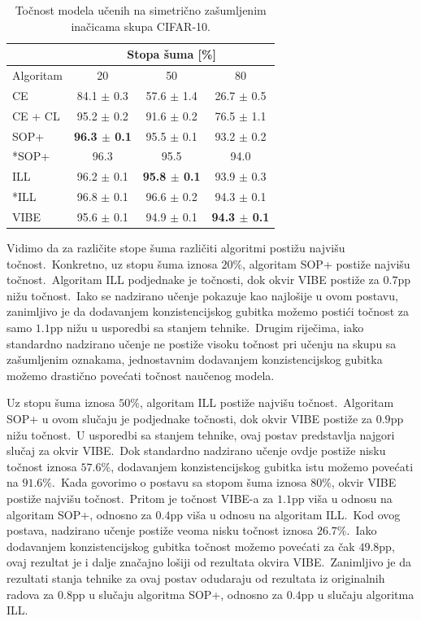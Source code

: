 \documentclass[diplomskirad]{fer}
\begin{document}
\begin{table}[htb]
  \caption{Točnost modela učenih na simetrično zašumljenim inačicama skupa CIFAR-10.}
  \label{tbl:usporedba_simetricne}
  \centering
  \begin{tabular}{l||ccc}
  & \multicolumn{3}{c}{Stopa šuma [\%]} \\ \hline
  Algoritam & 20 & 50 & 80 \\ \hline \hline
  CE & 84.1 $\pm$ 0.3 & 57.6 $\pm$ 1.4 & 26.7 $\pm$ 0.5\\
  CE + CL & 95.2 $\pm$ 0.2 & 91.6 $\pm$ 0.2 & 76.5 $\pm$ 1.1 \\ \hline
  SOP+ & \textbf{96.3 $\pm$ 0.1} & 95.5 $\pm$ 0.1 & 93.2 $\pm$ 0.2 \\
  *SOP+ & 96.3 & 95.5 & 94.0 \\
  ILL & 96.2 $\pm$ 0.1 & \textbf{95.8 $\pm$ 0.1} & 93.9 $\pm$ 0.3 \\
  *ILL & 96.8 $\pm$ 0.1 & 96.6 $\pm$ 0.2 & 94.3 $\pm$ 0.1 \\ \hline
  VIBE & 95.6 $\pm$ 0.1 & 94.9 $\pm$ 0.1 & \textbf{94.3 $\pm$ 0.1} \\
  \end{tabular}
\end{table}

\pagebreak

Vidimo da za različite stope šuma različiti algoritmi postižu najvišu točnost.\ 
Konkretno, uz stopu šuma iznosa $20\%$, algoritam SOP+ postiže najvišu točnost.\ Algoritam ILL podjednake je točnosti, dok okvir VIBE postiže za $0.7$pp nižu točnost.\ 
Iako se nadzirano učenje pokazuje kao najlošije u ovom postavu, zanimljivo je da dodavanjem konzistencijskog gubitka možemo postići točnost za samo $1.1$pp nižu u usporedbi sa stanjem tehnike.\ 
Drugim riječima, iako standardno nadzirano učenje ne postiže visoku točnost pri učenju na skupu sa zašumljenim oznakama, jednostavnim dodavanjem konzistencijskog gubitka možemo drastično povećati točnost naučenog modela.\ 

Uz stopu šuma iznosa $50\%$, algoritam ILL postiže najvišu točnost.\ Algoritam SOP+ u ovom slučaju je podjednake točnosti, dok okvir VIBE postiže za $0.9$pp nižu točnost.\ U usporedbi sa stanjem tehnike, ovaj postav predstavlja najgori slučaj za okvir VIBE.\ 
Dok standardno nadzirano učenje ovdje postiže nisku točnost iznosa $57.6\%$, dodavanjem konzistencijskog gubitka istu možemo povećati na $91.6\%$.\ 
Kada govorimo o postavu sa stopom šuma iznosa $80\%$, okvir VIBE postiže najvišu točnost.\ Pritom je točnost VIBE-a za $1.1$pp viša u odnosu na algoritam SOP+, odnosno za $0.4$pp viša u odnosu na algoritam ILL.\ 
Kod ovog postava, nadzirano učenje postiže veoma nisku točnost iznosa $26.7\%$.\ Iako dodavanjem konzistencijskog gubitka točnost možemo povećati za čak $49.8$pp, ovaj rezultat je i dalje značajno lošiji od rezultata okvira VIBE.\ 
Zanimljivo je da rezultati stanja tehnike za ovaj postav odudaraju od rezultata iz originalnih radova za $0.8$pp u slučaju algoritma SOP+, odnosno za $0.4$pp u slučaju algoritma ILL.\
\end{document}
